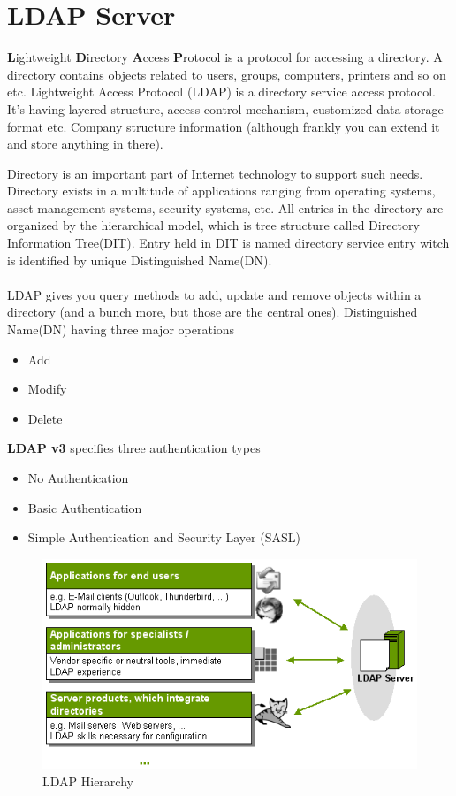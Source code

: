 \documentclass[12pt]{report}
\begin{document}
\section{LDAP Server}
\textbf{L}ightweight \textbf{D}irectory \textbf{A}ccess \textbf{P}rotocol is a protocol for accessing a directory. A directory contains objects related to users, groups, computers, printers and so on etc. Lightweight Access Protocol (LDAP) is a  directory service access protocol. It's having layered structure, access control mechanism, customized data storage format etc. Company structure information (although frankly you can extend it and store anything in there).

Directory is an important part of Internet technology to support such needs. Directory exists in a multitude of applications ranging from operating systems, asset management systems, security systems, etc. All entries in the directory are organized by the hierarchical model, which is tree structure called Directory Information Tree(DIT). Entry held in DIT is named directory service entry witch is identified by unique Distinguished Name(DN).\\
\\
LDAP gives you query methods to add, update and remove objects within a directory (and a bunch more, but those are the central ones). Distinguished Name(DN) having three major operations
\begin{itemize}
\item Add
\item Modify
\item Delete
\end{itemize}

\textbf{LDAP v3} specifies three authentication types
\begin{itemize}
\item No Authentication
\item Basic Authentication
\item Simple Authentication and Security Layer (SASL)
\end{itemize}

\begin{figure}[H]
\begin{center}
\includegraphics[scale=0.6]{ldap-tools}
\end{center}
\caption{LDAP Hierarchy\label{fig:LDAP Hierarchy}}
\end{figure}
\end{document}
